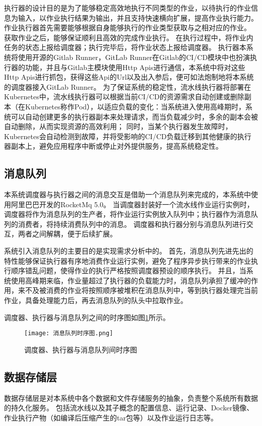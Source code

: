 执行器的设计目的是为了能够稳定高效地执行不同类型的作业，以待执行的作业信息为输入，以作业执行结果为输出，并且支持快速横向扩展，提高作业执行能力。
作业执行器首先需要能够根据自身能够执行的作业类型获取与之相对应的作业。
获取作业之后，能够保证顺利且高效的完成作业执行。
在执行过程中，将作业内任务的状态上报给调度器；执行完毕后，将作业状态上报给调度器。
执行器本系统将使用开源的Gitlab Runner，GitLab Runner在Gitlab的CI/CD模块中也扮演执行器的功能，并且与Gitlab主模块使用Http Apis进行通信，本系统中将对这些Http Apis进行抓包，获得这些Api的Url以及出入参后，便可如法炮制地将本系统的调度器接入GitLab Runner。
为了保证系统的稳定性，流水线执行器将部署在Kubernetes中，流水线执行器可以根据当前CI/CD的资源需求自动创建或删除副本（在Kubernetes称作Pod），以适应负载的变化：当系统进入使用高峰期时，系统可以自动创建更多的执行器副本来处理请求，而当负载减少时，多余的副本会被自动删除，从而实现资源的高效利用；
同时，当某个执行器发生故障时，Kubernetes会自动检测到故障，并将受影响的CI/CD负载迁移到其他健康的执行器副本上，避免应用程序中断或停止对外提供服务，提高系统稳定性。

\subsection{消息队列}

本系统调度器与执行器之间的消息交互是借助一个消息队列来完成的，本系统中使用阿里巴巴开发的RocketMq 5.0。
当调度器封装好一个流水线作业运行实例时，调度器将作为消息队列的生产者，将作业运行实例放入队列中；执行器作为消息队列的消费者，将持续消费队列中的消息。
调度器和执行器分别与消息队列进行交互，两者之间解耦，便于后续扩展。

系统引入消息队列的主要目的是实现需求分析中的。
首先，消息队列先进先出的特性能够保证执行器有序地消费作业运行实例，避免了程序异步执行带来的作业执行顺序错乱问题，使得作业的执行严格按照调度器预设的顺序执行。
并且，当系统使用高峰期来临，作业量超过了执行器的负载能力时，消息队列承担了缓冲的作用，来不及被消费的作业将按照顺序被堆积在消息队列中，等到执行器处理完当前作业，具备处理能力后，再去消息队列的队头中拉取作业。

调度器、执行器与消息队列之间的时序图如图\ref{fig:消息队列时序图}所示。

\begin{figure}[h]
  \centering
  \texttt{[image: 消息队列时序图.png]}
  \caption{调度器、执行器与消息队列间时序图}
  \label{fig:消息队列时序图}
\end{figure}

\subsection{数据存储层}
数据存储层是对本系统中各个数据和文件存储服务的抽象，负责整个系统所有数据的持久化服务。
包括流水线以及其子概念的配置信息、运行记录、Docker镜像、作业执行产物（如编译后压缩产生的tar包等）以及作业运行日志等。

